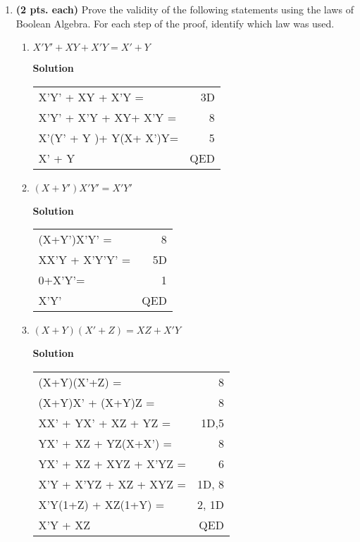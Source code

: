 \begin{enumerate}
\item  \textbf{ (2 pts. each)} Prove the validity of the following 
statements using the laws of Boolean Algebra. For each step of 
the proof, identify which law was used.
\begin{enumerate}
	\item $X'Y' + XY + X'Y = X' + Y$

\begin{onlysolution}  \textbf{Solution} \itshape

\begin{tabular}{lr}
X'Y' + XY + X'Y = 	& 3D\\
X'Y' + X'Y + XY+ X'Y =	& 8 \\
X'(Y' + Y )+ Y(X+ X')Y=	& 5 \\
X' + Y 			& QED \\
\end{tabular} \end{onlysolution}

	\item $(X+Y')X'Y' = X'Y'$

\begin{onlysolution}  \textbf{Solution} \itshape

\begin{tabular}{lr}
(X+Y')X'Y' = 	& 8 \\
XX'Y + X'Y'Y' = & 5D \\
0+X'Y'= 	& 1 \\
X'Y' 		& QED \\
\end{tabular}\end{onlysolution}

	\item $(X+Y)(X'+Z) = XZ + X'Y$

\begin{onlysolution}  \textbf{Solution} \itshape

\begin{tabular}{lr}
(X+Y)(X'+Z) = 		& 8 \\
(X+Y)X' + (X+Y)Z = 	& 8 \\
XX' + YX' + XZ + YZ =	& 1D,5 \\
YX' + XZ + YZ(X+X') =  	& 8 \\
YX' + XZ + XYZ + X'YZ =	& 6  \\
X'Y + X'YZ + XZ + XYZ =	& 1D, 8 \\
X'Y(1+Z) + XZ(1+Y) =  	& 2, 1D \\
X'Y + XZ 		& QED \\
\end{tabular} \end{onlysolution}


\end{enumerate}
\end{enumerate}
